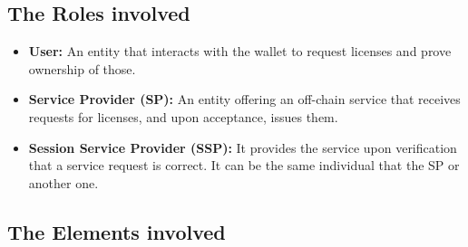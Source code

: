 \subsection{The Roles involved} 

\begin{itemize}
    \item \textbf{User:} An entity that interacts with the wallet to request licenses and prove ownership of those.
    \item \textbf{Service Provider (SP):} An entity offering an off-chain service that receives requests for licenses, and upon acceptance, issues them.
    \item \textbf{Session Service Provider (SSP):} It provides the service upon verification that a service request is correct. It can be the same individual that the SP or another one.
\end{itemize}

\subsection{The Elements involved} 

